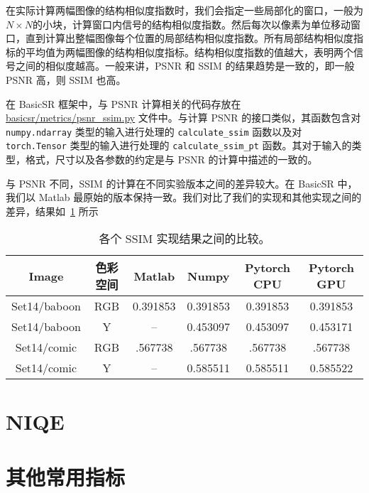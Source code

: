 \documentclass[../main.tex]{subfiles}
\begin{document}
在实际计算两幅图像的结构相似度指数时，我们会指定一些局部化的窗口，一般为$N\times N$的小块，计算窗口内信号的结构相似度指数。然后每次以像素为单位移动窗口，直到计算出整幅图像每个位置的局部结构相似度指数。所有局部结构相似度指标的平均值为两幅图像的结构相似度指标。结构相似度指数的值越大，表明两个信号之间的相似度越高。一般来讲，PSNR 和 SSIM 的结果趋势是一致的，即一般 PSNR 高，则 SSIM 也高。

在 BasicSR 框架中，与 PSNR 计算相关的代码存放在 \href{https://github.com/XPixelGroup/BasicSR/blob/master/basicsr/metrics/psnr_ssim.py#L12}{basicsr/metrics/psnr\_ssim.py} 文件中。与计算 PSNR 的接口类似，其函数包含对 \texttt{numpy.ndarray} 类型的输入进行处理的 \texttt{calculate\_ssim} 函数以及对 \texttt{torch.Tensor} 类型的输入进行处理的 \texttt{calculate\_ssim\_pt} 函数。其对于输入的类型，格式，尺寸以及各参数的约定是与 PSNR 的计算中描述的一致的。

与 PSNR 不同，SSIM 的计算在不同实验版本之间的差异较大。在 BasicSR 中，我们以 Matlab 最原始的版本保持一致。我们对比了我们的实现和其他实现之间的差异，结果如\tablename~\ref{tab:psnr} 所示

\begin{table}[]
    \centering
    \begin{tabular}{c|c|c|c|c|c} 
    \toprule
        Image & 色彩空间 & Matlab & Numpy & Pytorch CPU & Pytorch GPU \\
        \midrule
        Set14/baboon & RGB & 0.391853 & 0.391853 & 0.391853 & 0.391853 \\
        Set14/baboon & Y & -- & 0.453097 & 0.453097 & 0.453171\\
        Set14/comic & RGB & .567738& .567738&.567738	&.567738\\
Set14/comic&Y&--&0.585511&0.585511&0.585522\\
\bottomrule
    \end{tabular}
    \caption{各个 SSIM 实现结果之间的比较。}
    \label{tab:psnr}
\end{table}

\section{NIQE}

\section{其他常用指标}
\end{document}
